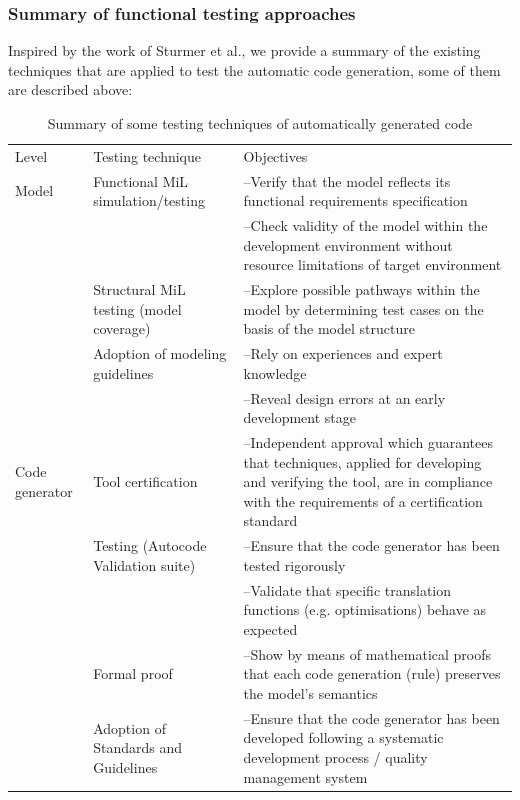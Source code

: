 \subsubsection{Summary of functional testing approaches}
Inspired by the work of Sturmer et al.\cite{sturmer2005overview}, we provide a summary of the existing techniques that are applied to test the automatic code generation, some of them are described above: 
	\begin{table}[H]
		\centering
		\caption{Summary of some testing techniques of automatically generated code}
		\begin{tabular}{| p{} | p{} |p{} |}\hline
			Level & Testing technique & Objectives \\	\hhline{|=|=|=|}	
			Model 
			& Functional MiL simulation/testing & 
			--Verify that the model reflects its functional requirements specification \\ 
			&& --Check validity of the model within the development environment
			without resource limitations of target environment \\
			\cline{2-3}
			& Structural MiL testing (model coverage) & --Explore possible pathways within the model by determining test cases on the basis of the model structure \\
			\cline{2-3}
			& Adoption of modeling guidelines & --Rely on experiences and expert knowledge\\
			&& --Reveal design errors at an early development stage \\
			\hline
			Code \newline generator  
			& Tool certification & --Independent approval which guarantees that techniques, applied for developing and verifying the tool, are in compliance with the requirements of a certification standard \\
			\cline{2-3}
			& Testing (Autocode Validation suite) & --Ensure that the code generator has been tested rigorously \\
			&& --Validate that specific translation functions (e.g. optimisations) behave
			as expected \\
			\cline{2-3}
			& Formal proof & --Show by means of mathematical proofs that each code generation (rule) preserves the model’s semantics \\
			\cline{2-3}
			& Adoption of Standards and Guidelines & --Ensure that the code generator has been developed following a systematic
			development process / quality management system \\ \hline

\end{tabular}
\end{table}
